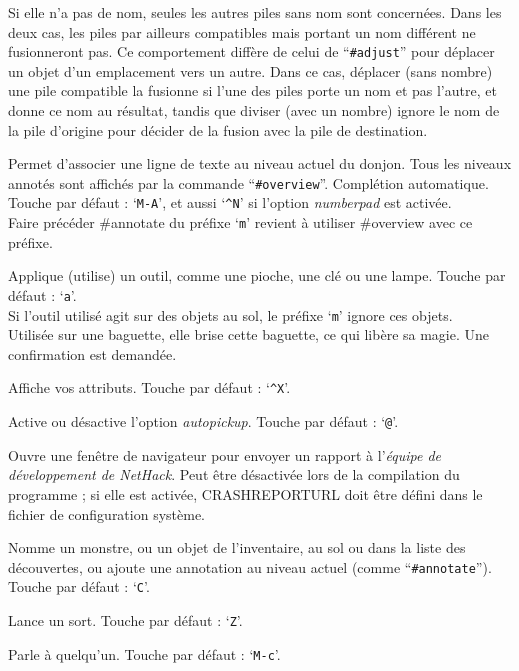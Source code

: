 \documentclass[titlepage]{article}
\begin{document}
\begin{description}[font=\mdseries\ttfamily]
Si elle n'a pas de nom, seules les autres piles sans nom sont concernées.
Dans les deux cas, les piles par ailleurs compatibles mais portant un nom différent
ne fusionneront pas.  Ce comportement diffère de celui de ``\texttt{\#adjust}'' pour déplacer
un objet d'un emplacement vers un autre.  Dans ce cas, déplacer (sans
nombre) une pile compatible la fusionne si l'une des piles porte un
nom et pas l'autre, et donne ce nom au résultat, tandis que
diviser (avec un nombre) ignore le nom de la pile d'origine pour
décider de la fusion avec la pile de destination.
\item[\#annotate]
Permet d'associer une ligne de texte au niveau actuel
du donjon.  Tous les niveaux annotés sont affichés par la
commande ``\texttt{\#overview}''. Complétion automatique.
Touche par défaut : `\texttt{M-A}',
et aussi `\texttt{\textasciicircum N}' si l'option \textit{number\textunderscore pad} est activée.
\\
Faire précéder \#annotate du préfixe `\texttt{m}' revient à utiliser
\#overview avec ce préfixe.
\item[\#apply]
Applique (utilise) un outil, comme une pioche, une clé ou une lampe.
Touche par défaut : `\texttt{a}'.\\
Si l'outil utilisé agit sur des objets au sol, le préfixe `\texttt{m}'
ignore ces objets.\\
Utilisée sur une baguette, elle brise cette baguette, ce qui libère sa
magie.  Une confirmation est demandée.
\item[\#attributes]
Affiche vos attributs. Touche par défaut : `\texttt{\textasciicircum X}'.
\item[\#autopickup]
Active ou désactive l'option \textit{autopickup}. Touche par défaut : `\texttt{@}'.
\item[\#bugreport]
Ouvre une fenêtre de navigateur pour envoyer un rapport à l'\textit{équipe de développement
de NetHack}.
Peut être désactivée lors de la compilation du programme ; si elle est activée,
CRASHREPORTURL doit être défini dans le fichier de configuration système.
\item[\#call]
Nomme un monstre, ou un objet de l'inventaire, au sol
ou dans la liste des découvertes, ou ajoute une annotation au
niveau actuel (comme ``\texttt{\#annotate}''). Touche par défaut : `\texttt{C}'.
\item[\#cast]
Lance un sort. Touche par défaut : `\texttt{Z}'.
\item[\#chat]
Parle à quelqu'un. Touche par défaut : `\texttt{M-c}'.

\end{description}
\end{document}
